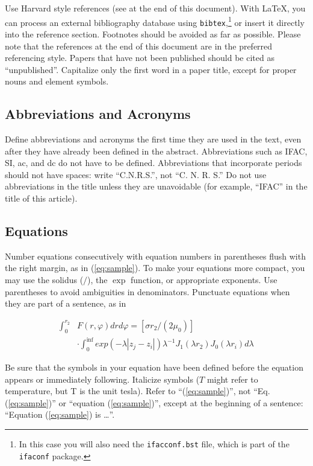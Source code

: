 \documentclass{ifacconf}
\begin{document}
Use Harvard style references (see at the end of this document). With
\LaTeX, you can process an external bibliography database 
using \texttt{bibtex},\footnote{In this case you will also need the \texttt{ifacconf.bst}
file, which is part of the \texttt{ifaconf} package.}
or insert it directly into the reference section. Footnotes should be avoided as
far as possible.  Please note that the references at the end of this
document are in the preferred referencing style. Papers that have not
been published should be cited as ``unpublished''.  Capitalize only the
first word in a paper title, except for proper nouns and element
symbols.

\subsection{Abbreviations and Acronyms}

Define abbreviations and acronyms the first time they are used in the
text, even after they have already been defined in the
abstract. Abbreviations such as IFAC, SI, ac, and dc do not have to be
defined. Abbreviations that incorporate periods should not have
spaces: write ``C.N.R.S.'', not ``C. N. R. S.'' Do not use abbreviations
in the title unless they are unavoidable (for example, ``IFAC'' in the
title of this article).

\subsection{Equations}

Number equations consecutively with equation numbers in parentheses
flush with the right margin, as in (\ref{eq:sample}).  To make your equations more
compact, you may use the solidus ($/$), the $\exp$ function, or
appropriate exponents. Use parentheses to avoid ambiguities in
denominators. Punctuate equations when they are part of a sentence, as
in

\begin{equation} \label{eq:sample2}
\begin{array}{ll}
\int_0^{r_2} & F (r, \varphi ) dr d\varphi = [\sigma r_2 / (2 \mu_0 )] \\
& \cdot \int_0^{\inf} exp(-\lambda |z_j - z_i |) \lambda^{-1} J_1 (\lambda  r_2 ) J_0 (\lambda r_i ) d\lambda 
\end{array}
\end{equation}

Be sure that the symbols in your equation have been defined before the
equation appears or immediately following. Italicize symbols ($T$
might refer to temperature, but T is the unit tesla). Refer to
``(\ref{eq:sample})'', not ``Eq. (\ref{eq:sample})'' or ``equation
(\ref{eq:sample})'', except at the beginning of a sentence: ``Equation
(\ref{eq:sample}) is \ldots''.
\end{document}
